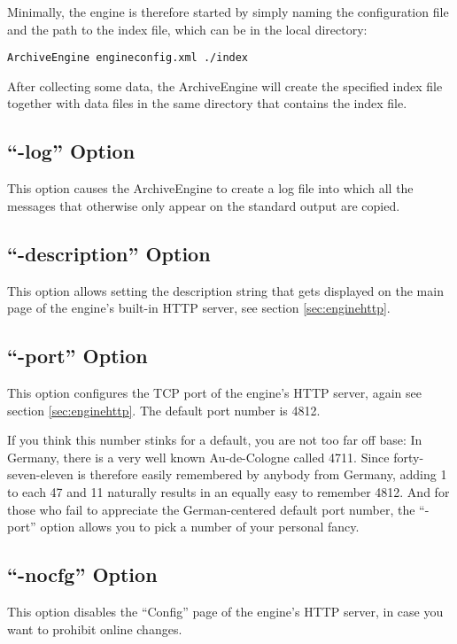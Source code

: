 \noindent Minimally, the engine is therefore started by simply naming the
configuration file and the path to the index file, which can be in the
local directory:

\begin{lstlisting}[frame=none,keywordstyle=\sffamily]
ArchiveEngine engineconfig.xml ./index
\end{lstlisting}

\noindent After collecting some data, the ArchiveEngine will create the
specified index file together with data files in the same directory
that contains the index file.

\subsection{``-log'' Option}
This option causes the ArchiveEngine to create a log file into which
all the messages that otherwise only appear on the standard output are copied.

\subsection{``-description'' Option} \label{sec:enginedesc}
This option allows setting the description string that gets displayed
on the main page of the engine's built-in HTTP server, see
section \ref{sec:enginehttp}.

\subsection{``-port'' Option} \label{sec:engineport}
This option configures the TCP port of the engine's HTTP server, again
see section \ref{sec:enginehttp}. The default port number is 4812.

If you think this number stinks for a default, you are not too far off
base: In Germany, there is a very well known Au-de-Cologne called
4711.  Since forty-seven-eleven is therefore easily remembered by
anybody from Germany, adding 1 to each 47 and 11 naturally results in
an equally easy to remember 4812.
And for those who fail to appreciate the German-centered default port
number, the ``-port'' option allows you to pick a number of your
personal fancy.

\subsection{``-nocfg'' Option}
This option disables the ``Config'' page of the engine's HTTP server,
in case you want to prohibit online changes.

